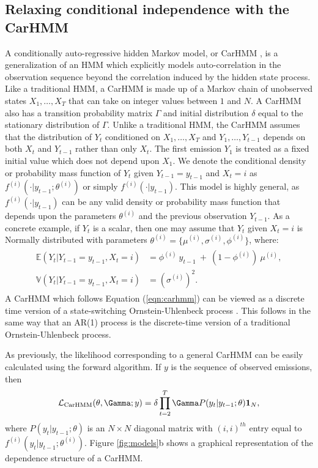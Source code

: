 \subsection{Relaxing conditional independence with the CarHMM}
\label{subsec:CarHMM}

A conditionally auto-regressive hidden Markov model, or CarHMM \citep{Lawler:2019}, is a generalization of an HMM which explicitly models auto-correlation in the observation sequence beyond the correlation induced by the hidden state process. Like a traditional HMM, a CarHMM is made up of a Markov chain of unobserved states $X_1,\ldots,X_T$ that can take on integer values between $1$ and $N$. A CarHMM also has a transition probability matrix $\Gamma$ and initial distribution $\delta$ equal to the stationary distribution of $\Gamma$. Unlike a traditional HMM, the CarHMM assumes that the distribution of $Y_t$ conditioned on $X_1,\ldots, X_T$ and $Y_1,\ldots, Y_{t-1}$ depends on both $X_t$ and $Y_{t-1}$ rather than only $X_t$. The first emission $Y_1$ is treated as a fixed initial value which does not depend upon $X_1$. We denote the conditional density or probability mass function of $Y_t$ given $Y_{t-1} = y_{t-1}$ and $X_t=i$ as $f^{(i)}(\cdot | y_{t-1}; \theta^{(i)})$ or simply $f^{(i)}(\cdot | y_{t-1})$. This model is highly general, as $f^{(i)}(\cdot | y_{t-1})$ can be any valid density or probability mass function that depends upon the parameters $\theta^{(i)}$ and the previous observation $Y_{t-1}$. 
As a concrete example, if $Y_t$ is a scalar, then one may assume that $Y_t$ given $X_t = i$ is Normally distributed with parameters $\theta^{(i)} = \{\mu^{(i)},\sigma^{(i)},\phi^{(i)}\}$, where:
%
\begin{align}
\label{eqn:carhmm}
\begin{split}
\mathbb{E}(Y_{t}|Y_{t-1} = y_{t-1},X_t=i) &= \phi^{(i)} ~ y_{t-1} ~+ ~(1-\phi^{(i)})  ~\mu^{(i)}, \\
\mathbb{V}(Y_t| Y_{t-1} = y_{t-1},X_t=i) &= (\sigma^{(i)})^2.
\end{split}
\end{align}
%
A CarHMM which follows Equation (\ref{eqn:carhmm}) can be viewed as a discrete time version of a state-switching Ornstein-Uhlenbeck process \citep{Michelot:2019}. This follows in the same way that an AR(1) process is the discrete-time version of a traditional Ornstein-Uhlenbeck process. 

As previously, the likelihood corresponding to a general CarHMM can be easily calculated using the forward algorithm. If $y$ is the sequence of observed emissions, then
\begin{equation*}
    \calL_{\text{CarHMM}}(\theta,\Gamma;y) = \delta \prod_{t=2}^T \Gamma P(y_t|y_{t-1};\theta) \mathbf{1}_N,
    \label{eqn:CarHMM_likelihood}
\end{equation*}
where
%
$P(y_t|y_{t-1};\theta)$ is an $N \times N$ diagonal matrix with $(i,i)^{th}$ entry equal to $f^{(i)}(y_t|y_{t-1}; \theta^{(i)})$. Figure \ref{fig:models}b shows a graphical representation of the dependence structure of a CarHMM. 

